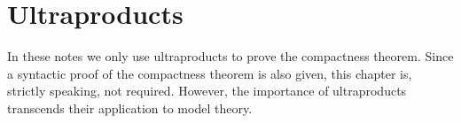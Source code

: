 \chapter{Ultraproducts}
\label{ultraprodotti}

\def\medrel#1{\parbox[t]{6ex}{$\displaystyle\hfil #1$}}
\def\ceq#1#2#3{\parbox[b]{25ex}{$\displaystyle #1$}\medrel{#2}$\displaystyle  #3$}

In these notes we only use ultraproducts to prove the compactness theorem.
Since a syntactic proof of the compactness theorem is also given, this chapter is, strictly speaking, not required.
However, the importance of ultraproducts transcends their application to model theory.











